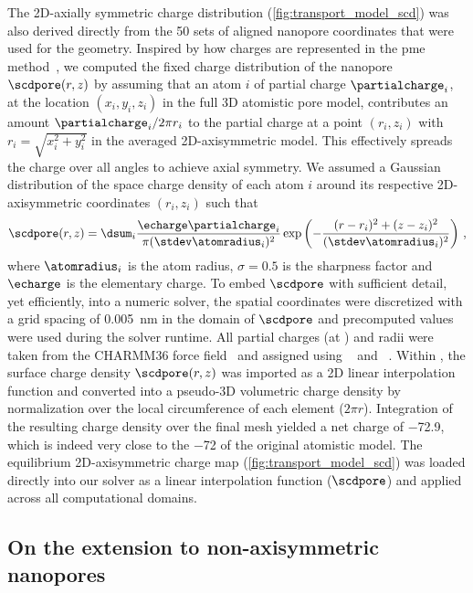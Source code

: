 The 2D-axially symmetric charge distribution (\cref{fig:transport_model_scd}) was also derived directly from
the 50 sets of aligned nanopore coordinates that were used for the geometry. Inspired by how charges are
represented in the \gls{pme} method~\cite{Aksimentiev-2005}, we computed the fixed charge distribution of the
nanopore $\scdpore(r,z)$ by assuming that an atom $i$ of partial charge $\partialcharge_{i}$, at the location
$(x_i, y_i, z_i)$ in the full 3D atomistic pore model, contributes an amount $\partialcharge_{i}/2\pi r_i$ to
the partial charge at a point $(r_i,z_i)$ with $r_i = \sqrt{x_i^2 + y_i^2}$ in the averaged 2D-axisymmetric
model. This effectively spreads the charge over all angles to achieve axial symmetry. We assumed a Gaussian
distribution of the space charge density of each atom $i$ around its respective 2D-axisymmetric coordinates
$(r_i,z_i)$ such that
%
\begin{align}\label{eq:scdpore}
  \scdpore(r,z) = \dsum_{i} \dfrac{\echarge\partialcharge_{i}}{\pi(\stdev\atomradius_{i})^2}
            \exp{\left(-\dfrac{(r-r_i)^2 + (z-z_i)^2}{(\stdev\atomradius_{i})^2}\right)}
  \text{ ,}
\end{align}
%
where $\atomradius_{i}$ is the atom radius, $\sigma = 0.5$ is the sharpness factor and $\echarge$ is the
elementary charge. To embed $\scdpore$ with sufficient detail, yet efficiently, into a numeric solver, the
spatial coordinates were discretized with a grid spacing of \SI{0.005}{\nm} in the domain of $\scdpore$ and
precomputed values were used during the solver runtime. All partial charges (at ) and radii were taken
from the CHARMM36 force field~\cite{Best-2012} and assigned using ~\cite{Olsson-2011} and
~\cite{Jurrus-2018}. Within , the surface charge density $\scdpore(r,z)$ was
imported as a 2D linear interpolation function and converted into a pseudo-3D volumetric charge density by
normalization over the local circumference of each element ($2 \pi r$). Integration of the resulting charge
density over the final mesh yielded a net charge of \SI{-72.9}{\ec}, which is indeed very close to the
\SI{-72}{\ec} of the original atomistic model. The equilibrium 2D-axisymmetric charge map
(\cref{fig:transport_model_scd}) was loaded directly into our solver as a linear interpolation function
($\scdpore$) and applied across all computational domains.



\subsection{On the extension to non-axisymmetric nanopores}
%

